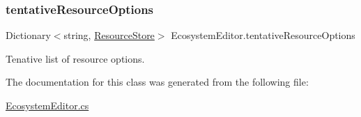 \subsubsection{\texorpdfstring{tentative\+Resource\+Options}{tentativeResourceOptions}}
{\footnotesize\ttfamily Dictionary$<$string, \mbox{\hyperlink{class_resource_store}{Resource\+Store}}$>$ Ecosystem\+Editor.\+tentative\+Resource\+Options}



Tenative list of resource options. 



The documentation for this class was generated from the following file\+:\begin{DoxyCompactItemize}
\item 
\mbox{\hyperlink{_ecosystem_editor_8cs}{Ecosystem\+Editor.\+cs}}\end{DoxyCompactItemize}
